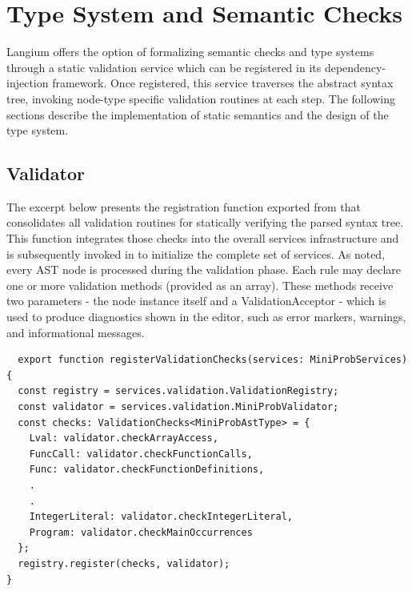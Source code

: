 \section{Type System and Semantic Checks}

Langium offers the option of formalizing semantic checks and type systems through a static validation service which can be registered in its dependency-injection framework.
Once registered, this service traverses the abstract syntax tree, invoking node-type specific validation routines at each step.
The following sections describe the implementation of static semantics and the design of the type system.

\subsection*{Validator}

The excerpt below presents the registration function exported from  that consolidates all validation routines for statically
verifying the parsed syntax tree. This function integrates those checks into the overall services infrastructure and is subsequently invoked in  to
initialize the complete set of services. As noted, every AST node is processed during the validation phase. Each rule may declare one or more validation methods
(provided as an array). These methods receive two parameters - the node instance itself and a ValidationAcceptor - which is used to produce diagnostics shown in the editor, such as error markers, warnings, and informational messages.


\begin{verbatim}
  export function registerValidationChecks(services: MiniProbServices) {
  const registry = services.validation.ValidationRegistry;
  const validator = services.validation.MiniProbValidator;
  const checks: ValidationChecks<MiniProbAstType> = {
    Lval: validator.checkArrayAccess,
    FuncCall: validator.checkFunctionCalls,
    Func: validator.checkFunctionDefinitions,
    .
    .
    IntegerLiteral: validator.checkIntegerLiteral,
    Program: validator.checkMainOccurrences
  };
  registry.register(checks, validator);
}
\end{verbatim}
\vspace{0.5em}

